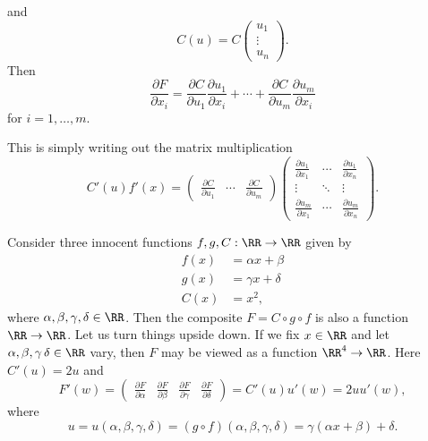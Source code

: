 \documentclass{article}
\begin{document}
and
$$
C(u) = C
\begin{pmatrix} u_1\\ \vdots \\ u_n
\end{pmatrix}.
$$
Then
$$
\frac{\partial F}{\partial x_i} =
\frac{\partial C}{\partial u_1}\frac{\partial u_1}{\partial x_i} + \cdots +
\frac{\partial C}{\partial u_m} \frac{\partial u_m}{\partial x_i}
$$
for $i = 1, \dots, m$.


This is simply writing out the matrix multiplication
$$
  C'(u) f'(x) =
  \begin{pmatrix}
    \frac{\partial C}{\partial u_1} & \cdots & \frac{\partial C}{\partial u_m}
  \end{pmatrix}
  \begin{pmatrix}
    \frac{\partial u_1}{\partial x_1} & \cdots & \frac{\partial u_1}{\partial x_n}\\
    \vdots & \ddots & \vdots \\
   \frac{\partial u_m}{\partial x_1} & \cdots & \frac{\partial u_m}{\partial x_n}
  \end{pmatrix}.
$$

\begin{example}
  Consider three innocent functions $f, g, C: \RR\rightarrow \RR$ given by
  \begin{align*}
    f(x) &= \alpha x + \beta\\
    g(x) &= \gamma x + \delta\\
    C(x) &= x^2,
  \end{align*}
  where $\alpha, \beta, \gamma, \delta\in \RR$.
  Then the composite $F = C\circ g\circ f$ is also a function $\RR\rightarrow
  \RR$. Let us turn things upside down. If we fix $x\in \RR$ and let
  $\alpha, \beta, \gamma\, \delta\in \RR$ vary, then $F$ may be viewed
  as a function $\RR^4\rightarrow \RR$. Here $C'(u) = 2 u$ and
  $$
  F'(w) = \begin{pmatrix}
    \frac{\partial F}{\partial \alpha} &
    \frac{\partial F}{\partial \beta} &
    \frac{\partial F}{\partial \gamma} &
    \frac{\partial F}{\partial \delta} 
  \end{pmatrix} =
  C'(u) u'(w) = 2 u u'(w),
  $$
  where
  $$
  u = u(\alpha, \beta, \gamma, \delta) = (g\circ f)(\alpha, \beta, \gamma, \delta) = \gamma ( \alpha x + \beta) + \delta.
  $$

\end{example}
\end{document}
